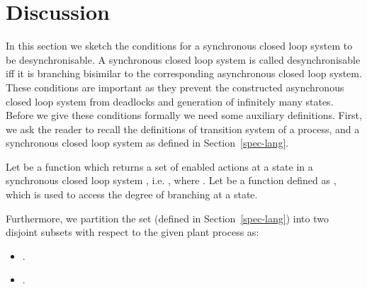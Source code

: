 \documentclass[a4paper,english,final]{article}
\theoremstyle{plain}
\theoremstyle{definition}
\begin{document}
\section{Discussion}\label{sec-disc}
In this section we sketch the conditions for a synchronous closed loop system to be desynchronisable. A synchronous closed loop system is called desynchronisable iff it is branching bisimilar to the corresponding asynchronous closed loop system. These conditions are important as they prevent the constructed asynchronous closed loop system from deadlocks and generation of infinitely many states. Before we give these conditions formally we need some auxiliary definitions. First, we ask the reader to recall the definitions of transition system of a process, and a synchronous closed loop system as defined in Section~\ref{spec-lang}.

Let  be a function which returns a set of enabled actions at a state in a synchronous closed loop system , i.e. , where . Let  be a function defined as , which is used to access the degree of branching at a state.

Furthermore, we partition the set  (defined in Section~\ref{spec-lang}) into two disjoint subsets  with respect to the given plant process  as:
\begin{itemize}
\item .
\item .
\end{itemize}
\end{document}
